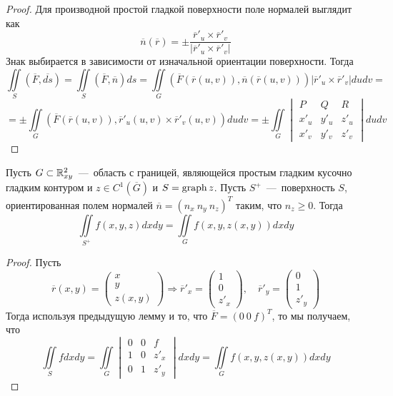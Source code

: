 \begin{proof}
    Для производной простой гладкой поверхности поле нормалей выглядит как \[\overline{n}(\overline{r}) = \pm\dfrac{\overline{r}'_u \times \overline{r}'_v}{|\overline{r}'_u \times \overline{r}'_v|}\]
    Знак выбирается в зависимости от изначальной ориентации поверхности. Тогда \[
    \iint\limits_S (\overline{F}, \overline{ds}) = \iint\limits_{S}(\overline{F}, \overline{n})ds = \iint\limits_G (\overline{F}(\overline{r}(u, v)), \overline{n}(\overline{r}(u, v)))|\overline{r}'_u \times \overline{r}'_v|dudv = \]\[ =  \pm\iint\limits_G (\overline{F}(\overline{r}(u, v)), \overline{r}'_u(u, v) \times \overline{r}'_v(u, v))dudv = \pm \iint\limits_G \begin{vmatrix}
        P & Q & R \\ x'_u & y'_u & z'_u \\ x'_v & y'_v & z'_v
    \end{vmatrix} dudv
    \]
\end{proof}
\hypertarget{graph_gaus}{}
\begin{theorem}
    Пусть $G \subset \mathbb{R}^2_{xy}$~---~область с границей, являющейся простым гладким кусочно гладким контуром и $z \in C^1(\overline{G})$ и $S = \operatorname{graph} z$. Пусть $S^+$~---~поверхность $S$, ориентированная полем нормалей $\overline{n} = (n_x \  n_y \  n_z)^T$ таким, что $n_z \geq 0$. Тогда \[
    \iint\limits_{S^+} f(x, y, z)dxdy = \iint\limits_G f(x, y, z(x, y))dxdy
    \]
\end{theorem}
\begin{proof}
    Пусть \begin{equation*}
        \overline{r}(x, y) = \begin{pmatrix}
            x \\ y \\ z(x, y)
        \end{pmatrix} \Rightarrow \overline{r}'_x = \begin{pmatrix}
            1 \\ 0 \\ z'_x
        \end{pmatrix}, \quad \overline{r}'_y = \begin{pmatrix}
            0 \\ 1 \\ z'_y
        \end{pmatrix}
    \end{equation*}
    Тогда используя предыдущую лемму и то, что $\overline{F} = (0 \ 0 \ f)^T$, то мы получаем, что \[
    \iint\limits_S fdxdy = \iint\limits_G \begin{vmatrix}
        0 & 0 & f \\ 1 & 0 & z'_x \\ 0 & 1 & z'_y
    \end{vmatrix}dxdy =  \iint\limits_G f(x, y, z(x, y))dxdy
    \]
\end{proof}

